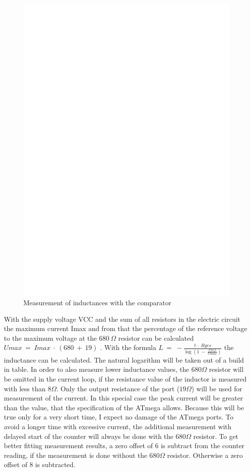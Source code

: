 \begin{figure}[H]
\centering
\includegraphics[]{../FIG/Inductance.eps}
\caption{Measurement of inductances with the comparator}
\label{fig:Inductance}
\end{figure}

With the supply voltage VCC and the sum of all resistors in the electric circuit the maximum current Imax and from
that the percentage of the reference voltage to the maximum voltage at the \(680~\Omega\) resistor can be calculated
\(Umax~=~Imax~\cdot~(680~+~19)\) .
With the formula \(L~=~-\frac{t~\cdot~Rges}{\log{(1~-~\frac{Uref}{Umax})}}\) the inductance can be calculated.
The natural logarithm will be taken out of a build in table.
In order to also measure lower inductance values, the \(680 \Omega\) resistor will be omitted in the current loop,
if the resistance value of the inductor is measured with less than \(8 \Omega\).
Only the output resistance of the port (\(19 \Omega\)) will be used for measurement of the current.
In this special case the peak current will be greater than the value, that the specification of the ATmega allows.
Because this will be true only for a very short time, I expect no damage of the ATmega ports.
To avoid a longer time with excessive current, the additional measurement with delayed start of the counter will always be
done with the \(680 \Omega\) resistor.
To get better fitting measurement results, a zero offset of 6 is subtract from the counter reading, 
if the measurement is done without the \(680 \Omega\) resistor. Otherwise a zero offset of 8 is subtracted.


